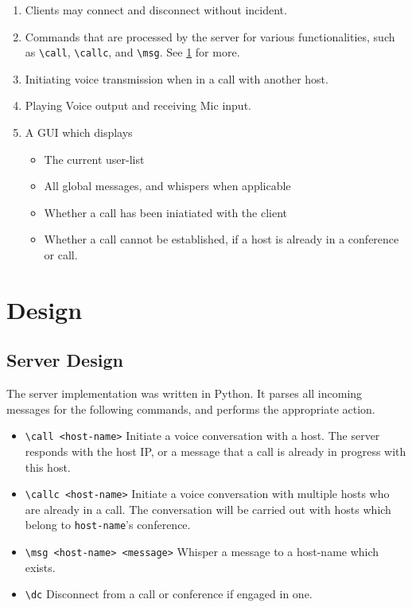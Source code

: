 \documentclass[10pt,a4paper]{article}
\begin{document}
\begin{enumerate}
 \item Clients may connect and disconnect without incident.
 \item Commands that are processed by the server for various functionalities, such as \verb|\call|, \verb|\callc|, and \verb|\msg|. See \ref{det} for more.
 \item Initiating voice transmission when in a call with another host.
 \item Playing Voice output and receiving Mic input.
 \item A GUI which displays
 \begin{itemize}
  \item The current user-list
  \item All global messages, and whispers when applicable
  \item Whether a call has been iniatiated with the client
  \item Whether a call cannot be established, if a host is already in a conference or call.
 \end{itemize}

\end{enumerate}



\section{Design}
\label{det}
\subsection{Server Design}
The server implementation was written in Python. It parses all incoming messages for the following commands,
and performs the appropriate action.

\begin{itemize}
 \item \verb|\call <host-name>| Initiate a voice conversation with a host. The server responds with the host IP, or a message that a call is already in progress with this host.
 \item \verb|\callc <host-name>| Initiate a voice conversation with multiple hosts who are already in a call. The conversation will be carried out with hosts which belong to \verb|host-name|'s conference.
 \item \verb|\msg <host-name> <message>| Whisper a message to a host-name which exists.
 \item \verb|\dc| Disconnect from a call or conference if engaged in one.
\end{itemize}
\end{document}
